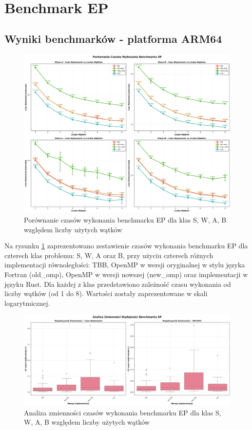 
\section{Benchmark EP}
\subsection{Wyniki benchmarków - platforma ARM64}
\begin{figure}[H]
    \centering
    \includegraphics[width=\textwidth]{analiza/images/parallel/ep/arm/ep_porownanie_czasow_wykonania.png}
    \caption{Porównanie czasów wykonania benchmarku EP dla klas S, W, A, B względem liczby użytych wątków}
    \label{ep_porownanie_czasow_wykonania}
\end{figure}

Na rysunku \ref{ep_porownanie_czasow_wykonania} zaprezentowano zestawienie czasów wykonania benchmarku EP dla czterech klas problemu: S, W, A oraz B, przy użyciu czterech różnych implementacji równoległości: TBB, OpenMP w wersji oryginalnej w stylu języka Fortran (old\_omp), OpenMP w wersji nowszej (new\_omp) oraz implementacji w języku Rust. Dla każdej z klas przedstawiono zależność czasu wykonania od liczby wątków (od 1 do 8). Wartości zostały zaprezentowane w skali logarytmicznej.

\begin{figure}[H]
    \centering
    \includegraphics[width=\textwidth]{analiza/images/parallel/ep/arm/ep_analiza_zmiennosci.png}
    \caption{Analiza zmienności czasów wykonania benchmarku EP dla klas S, W, A, B względem liczby użytych wątków}
    \label{ep_analiza_zmiennosci}
\end{figure}

